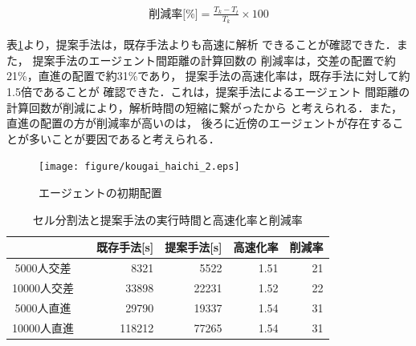 \documentclass{maelab_y}
\newcommand{\分類条件}{
\begin{table}[t]
\begin{center}
\caption{進行方向を分類する条件}
\ecaption{Classification condition of moving direction $e_{i}$.}
\label{tb:hantei_jouken}
\begin{tabular}{c|c|c|c|c}
\hline \hline
			& 右 & 左 & 上 & 下 \\ \hline
パターン2   & $\frac{1}{\sqrt{2}} < e_x \leq 1  $
		    & $ -1 \leq e_x < \frac{-1}{\sqrt{2}}$ 
		    & $ \frac{-1}{\sqrt{2}} < e_x < \frac{1}{\sqrt{2}} $ 
		    & $ \frac{-1}{2} < e_x < \frac{1}{2} $ \\
パターン3   & $\frac{-1}{2} < e_y < \frac{1}{2} $ 
		    & $\frac{-1}{2} < e_y < \frac{1}{2} $
            & $ \frac{1}{\sqrt{2}} < e_y \leq 1$
		    & $ -1 \leq e_y < \frac{-1}{\sqrt{2}} $ \\
\hline
\multirow{2}{*}{パターン4}   
			& $R_x \geq A_x$ & $R_x < A_x$ & $R_y \geq A_y$ & $R_y < A_y $ \\
	        &  $L_x \geq A_x$ & $L_x < A_x$ & $L_y \geq A_y$ & $L_y < A_y$ \\
\hline
\multirow{2}{*}{パターン5}   
 			& $R_x \geq x_1$ & $R_x < x_2$ & $R_y \geq y_1$ & $R_y < y_2 $ \\
			& $L_x \geq x_1$ & $L_x < x_2$ & $L_y \geq y_1$ & $L_y < y_2 $ \\
\hline
パターン6   & $ \cos(\frac{1}{2}\theta_{view}) \leq  e_y $ 
			& $ e_y \leq -\cos(\frac{1}{2}\theta_{view})$ 
			& $ \sin(\frac{1}{2}(\pi - \theta_{view})) \leq e_x $ 
			& $ e_x \leq \sin(\frac{1}{2}(\pi - \theta_{view}))  $ \\
\hline
\end{tabular}
\end{center}
\end{table}}
\newcommand{\距離計算new}{
  \begin{table}[]
    \caption{エージェント間距離の計算回数[$10^{10}$回]}
    \label{tab:my-table}
    \begin{tabular}{c|llllll}
    \hline
    \multirow{2}{*}{人数}   & \multicolumn{6}{c}{パターン}                                                                                                                                                              \\ \cline{2-7} 
                          & \multicolumn{1}{c|}{1}    & \multicolumn{1}{c|}{2}               & \multicolumn{1}{c|}{3}      & \multicolumn{1}{c|}{4}      & \multicolumn{1}{c|}{5}      & \multicolumn{1}{c}{6}    \\ \hline
    \multirow{2}{*}{3000} & \multicolumn{1}{r|}{5.1}  & \multicolumn{1}{r|}{\textbf{3.9}}    & \multicolumn{1}{r|}{4.0}    & \multicolumn{1}{r|}{4.4}    & \multicolumn{1}{r|}{4.1}    & \multicolumn{1}{r}{4.4}  \\
                          & \multicolumn{1}{l|}{}     & \multicolumn{1}{l|}{\textbf{(24\%)}} & \multicolumn{1}{l|}{(23\%)} & \multicolumn{1}{l|}{(15\%)} & \multicolumn{1}{l|}{(21\%)} & (15\%)                   \\ \hline
    \multirow{2}{*}{5000} & \multicolumn{1}{r|}{14.4} & \multicolumn{1}{r|}{\textbf{10.9}}   & \multicolumn{1}{r|}{11.1}   & \multicolumn{1}{r|}{12.2}   & \multicolumn{1}{r|}{11.4}   & \multicolumn{1}{r}{12.2} \\
                          & \multicolumn{1}{l|}{}     & \multicolumn{1}{l|}{\textbf{(24\%)}} & \multicolumn{1}{l|}{(23\%)} & \multicolumn{1}{l|}{(15\%)} & \multicolumn{1}{l|}{(21\%)} & (15\%)                   \\ \hline
    \multirow{2}{*}{7500} & \multicolumn{1}{r|}{33.1} & \multicolumn{1}{r|}{\textbf{25.2}}   & \multicolumn{1}{r|}{25.8}   & \multicolumn{1}{r|}{28.3}   & \multicolumn{1}{r|}{26.7}   & \multicolumn{1}{r}{28.3} \\
                          & \multicolumn{1}{l|}{}     & \multicolumn{1}{l|}{\textbf{(24\%)}} & \multicolumn{1}{l|}{(22\%)} & \multicolumn{1}{l|}{(15\%)} & \multicolumn{1}{l|}{(20\%)} & (15\%)                   \\ \hline
    \end{tabular}
    \end{table}
}
\newcommand{\距離計算回数}{
\begin{table}[hbtp]
\begin{center}
\caption{エージェント間距離の計算回数[$10^{10}$回]}
\label{tb:count_result_yobi}
\begin{tabular}{c|r|r|r|r|r|r}
\hline \hline
	人数 & 1 & 2 & 3 & 4 & 5 & 6 \\  
	\hline
	\multirow{2}{*}{3000} 
	& 5.1   & $\mathbf{3.9}$   & 4.0    & 4.4    & 4.1    & 4.4   \\  
	&       & ($\mathbf{24.5}$\%) 					& (22.9\%) & (15.3\%) & (20.7\%) & (15.2\%) \\ \hline
	\multirow{2}{*}{5000} 
	& 14.4  &  $\mathbf{10.9}$  					  & 11.1   & 12.2   & 11.4   & 12.2  \\  
	&       & ($\mathbf{23.8}$\%) 					& (22.6\%) & (15.2\%) & (20.5\%) & (15.1\%) \\ \hline
	\multirow{2}{*}{7500} 
	& 33.1  & $\mathbf{25.2}$	 		    	 	 & 25.8   & 28.3   & 26.7   & 28.3  \\ 
	&       & ($\mathbf{23.9}$\%) 					& (22.2\%) & (14.6\%) & (19.4\%) & (14.6\%) \\ \hline
    \end{tabular}
  \end{center}
\end{table}}
\begin{document}
\begin{eqnarray}
  \label{eq:sakugenritu}
  \mbox{削減率[\%]} =
  \frac{T_{k} - T_{t}}{T_{k}} \times 100
\end{eqnarray}

表\ref{tab:result}より，提案手法は，既存手法よりも高速に解析
できることが確認できた．また，
提案手法のエージェント間距離の計算回数の
削減率は，交差の配置で約21\%，直進の配置で約31\%であり，
提案手法の高速化率は，既存手法に対して約1.5倍であることが
確認できた．これは，提案手法によるエージェント
間距離の計算回数が削減により，解析時間の短縮に繋がったから
と考えられる．また，直進の配置の方が削減率が高いのは，
後ろに近傍のエージェントが存在することが多いことが要因であると考えられる．

\begin{figure}[hbtp]
 \begin{center}
  \texttt{[image: figure/kougai\_haichi\_2.eps]}
  \caption{エージェントの初期配置}
  \label{fig:agent_haichi_image}
 \end{center}
\end{figure}
\fi

\begin{table}[hbtp]
  \begin{center}
    \caption{セル分割法と提案手法の実行時間と高速化率と削減率}
    \label{tab:result}
    \begin{tabular}{c|c|c|c|c}
      \hline \hline
        &　既存手法[s] & 提案手法[s] & 高速化率 & 削減率 \\
      \hline
      5000人交差 & \multicolumn{1}{|r|}{8321} &
       \multicolumn{1}{|r|}{5522} &
       \multicolumn{1}{|r|}{1.51} &
       \multicolumn{1}{|r}{21} \\
      \hline
      10000人交差 &
      \multicolumn{1}{|r|}{33898} &
      \multicolumn{1}{|r|}{22231} &
      \multicolumn{1}{|r|}{1.52}  &
      \multicolumn{1}{|r}{22} \\
      \hline
      5000人直進 &
      \multicolumn{1}{|r|}{29790} &
      \multicolumn{1}{|r|}{19337} &
      \multicolumn{1}{|r|}{1.54}  &
      \multicolumn{1}{|r}{31} \\
      \hline
      10000人直進 &
      \multicolumn{1}{|r|}{118212} &
      \multicolumn{1}{|r|}{77265} &
      \multicolumn{1}{|r|}{1.54} &
      \multicolumn{1}{|r}{31}  \\
      \hline
    \end{tabular}
  \end{center}
\end{table}
\end{document}
